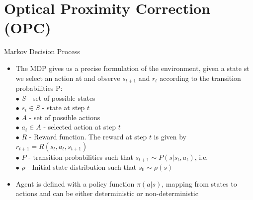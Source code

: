 \graphicspath{{./figs/repo/}{./figs/}}
\section{Optical Proximity Correction (OPC)}

\begin{frame}{Markov Decision Process}
    \begin{itemize}
        
        \item The MDP gives us a precise formulation of the environment, given a state st we select an action at and observe $s_{t+1}$ and $r_{t}$ according to the transition probabilities P:\\
        \bigskip
        \hspace{0.5cm}$\bullet$  $S$ - set of possible states \\
        \hspace{0.5cm}$\bullet$  $s_{t}\in S$ - state at step $t$ \\
        \hspace{0.5cm}$\bullet$  $A$ - set of possible actions \\
        \hspace{0.5cm}$\bullet$  $a_{t}\in A$ - selected action at step $t$\\
        \hspace{0.5cm}$\bullet$  $R$ - Reward function. The reward at step $t$ is given by $r_{t+1} = R(s_{t}, a_{t}, s_{t+1})$\\
        \hspace{0.5cm}$\bullet$ $P$ - transition probabilities such that $s_{t+1} ∼ P(s|s_{t},a_{t})$, i.e. \\
        \hspace{0.5cm}$\bullet$  $\rho$ - Initial state distribution such that $s_{0} ∼ \rho(s)$\\
        \bigskip
        \item Agent is defined with a policy function $\pi(a|s)$, mapping from states to actions and can be either deterministic or non-deterministic
        
    \end{itemize}
\end{frame}

